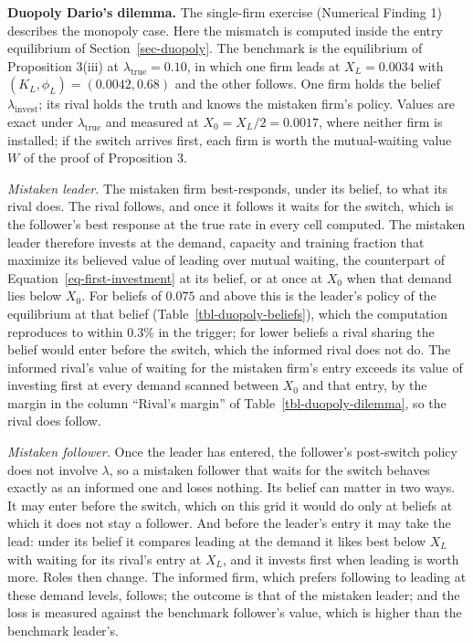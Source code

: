 \documentclass[
  11pt,
  letterpaper,
]{scrartcl}
\begin{document}
\textbf{Duopoly Dario's dilemma.} The single-firm exercise (Numerical
Finding 1) describes the monopoly case. Here the mismatch is computed
inside the entry equilibrium of Section~\ref{sec-duopoly}. The benchmark
is the equilibrium of Proposition 3(iii) at
\(\lambda_{\text{true}} = 0.10\), in which one firm leads at
\(X_L = 0.0034\) with \((K_L, \phi_L) = (0.0042, 0.68)\) and the other
follows. One firm holds the belief \(\lambda_{\text{invest}}\); its
rival holds the truth and knows the mistaken firm's policy. Values are
exact under \(\lambda_{\text{true}}\) and measured at
\(X_0 = X_L/2 = 0.0017\), where neither firm is installed; if the switch
arrives first, each firm is worth the mutual-waiting value \(W\) of the
proof of Proposition 3.

\emph{Mistaken leader.} The mistaken firm best-responds, under its
belief, to what its rival does. The rival follows, and once it follows
it waits for the switch, which is the follower's best response at the
true rate in every cell computed. The mistaken leader therefore invests
at the demand, capacity and training fraction that maximize its believed
value of leading over mutual waiting, the counterpart of
Equation~\ref{eq-first-investment} at its belief, or at once at \(X_0\)
when that demand lies below \(X_0\). For beliefs of \(0.075\) and above
this is the leader's policy of the equilibrium at that belief
(Table~\ref{tbl-duopoly-beliefs}), which the computation reproduces to
within \(0.3\%\) in the trigger; for lower beliefs a rival sharing the
belief would enter before the switch, which the informed rival does not
do. The informed rival's value of waiting for the mistaken firm's entry
exceeds its value of investing first at every demand scanned between
\(X_0\) and that entry, by the margin in the column ``Rival's margin''
of Table~\ref{tbl-duopoly-dilemma}, so the rival does follow.

\emph{Mistaken follower.} Once the leader has entered, the follower's
post-switch policy does not involve \(\lambda\), so a mistaken follower
that waits for the switch behaves exactly as an informed one and loses
nothing. Its belief can matter in two ways. It may enter before the
switch, which on this grid it would do only at beliefs at which it does
not stay a follower. And before the leader's entry it may take the lead:
under its belief it compares leading at the demand it likes best below
\(X_L\) with waiting for its rival's entry at \(X_L\), and it invests
first when leading is worth more. Roles then change. The informed firm,
which prefers following to leading at these demand levels, follows; the
outcome is that of the mistaken leader; and the loss is measured against
the benchmark follower's value, which is higher than the benchmark
leader's.
\end{document}
